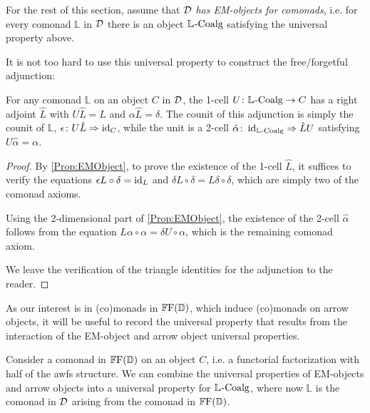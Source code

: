 For the rest of this section, assume that $\mathcal{D}$ \emph{has EM-objects for comonads}, i.e. for every comonad $\mathbb{L}$ in $\mathcal{D}$ there is an object $\mathbb{L}_{}\text{-}\mathrm{Coalg}$ satisfying the universal property above.

It is not too hard to use this universal property to construct the free/forgetful adjunction:

\begin{proposition}
	For any comonad $\mathbb{L}$ on an object $C$ in $\mathcal{D}$, the 1-cell $U\colon\mathbb{L}_{}\text{-}\mathrm{Coalg}\to C$ has a right adjoint $\hat{L}$ with $U\hat{L}=L$ and $\alpha\hat{L}=\delta$. The counit of this adjunction is simply the counit of $\mathbb{L}$, $\epsilon\colon U\hat{L}\Rightarrow\operatorname{id}_C$, while the unit is a 2-cell $\hat{\alpha}\colon\operatorname{id}_{\mathbb{L}_{}\text{-}\mathrm{Coalg}}\Rightarrow\hat{L}U$ satisfying $U\hat{\alpha}=\alpha$.
\end{proposition}
\begin{proof}
	By \cref{Prop:EMObject}, to prove the existence of the 1-cell $\hat{L}$, it suffices to verify the equations $\epsilon L\circ\delta=\operatorname{id}_L$ and $\delta L\circ\delta=L\delta\circ\delta$, which are simply two of the comonad axioms.

	Using the 2-dimensional part of \cref{Prop:EMObject}, the existence of the 2-cell $\hat{\alpha}$ follows from the equation $L\alpha\circ\alpha=\delta U\circ\alpha$, which is the remaining comonad axiom.

	We leave the verification of the triangle identities for the adjunction to the reader.
\end{proof}

As our interest is in (co)monads in $\mathbb{F}\mathrm{F}(\mathbb{D})$, which induce (co)monads on arrow objects, it will be useful to record the universal property that results from the interaction of the EM-object and arrow object universal properties.

Consider a comonad in $\mathbb{F}\mathrm{F}(\mathbb{D})$ on an object $C$, i.e. a functorial factorization with half of the awfs structure. We can combine the universal properties of EM-objects and arrow objects into a universal property for $\mathbb{L}_{}\text{-}\mathrm{Coalg}$, where now $\mathbb{L}$ is the comonad in $\mathcal{D}$ arising from the comonad in $\mathbb{F}\mathrm{F}(\mathbb{D})$.


